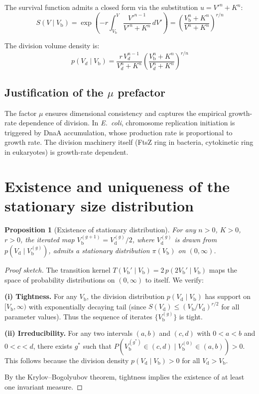 \documentclass[11pt]{article}
\newtheorem{proposition}{Proposition}
\newcommand{\Vb}{V_{\mathrm{b}}}
\newcommand{\Vd}{V_{\mathrm{d}}}
\begin{document}
The survival function admits a closed form via the substitution
$u = V'^n + K^n$:
\begin{equation}
  S(V \mid \Vb) = \exp\!\left(-r \int_{\Vb}^{V}
    \frac{V'^{n-1}}{V'^n + K^n}\, dV'\right)
  = \left(\frac{\Vb^n + K^n}{V^n + K^n}\right)^{r/n}
\end{equation}

The division volume density is:
\begin{equation}
  p(V_d \mid \Vb) = \frac{r\, V_d^{n-1}}{V_d^n + K^n}
    \left(\frac{\Vb^n + K^n}{V_d^n + K^n}\right)^{r/n}
\end{equation}

\subsection{Justification of the $\mu$ prefactor}

The factor $\mu$ ensures dimensional consistency and captures the
empirical growth-rate dependence of division.  In \textit{E.~coli},
chromosome replication initiation is triggered by DnaA accumulation,
whose production rate is proportional to growth
rate\cite{si2019}.  The division machinery itself (FtsZ ring in
bacteria, cytokinetic ring in eukaryotes) is growth-rate dependent.

\section{Existence and uniqueness of the stationary size distribution}

\begin{proposition}[Existence of stationary distribution]
For any $n > 0$, $K > 0$, $r > 0$, the iterated map
$\Vb^{(g+1)} = \Vd^{(g)}/2$, where $\Vd^{(g)}$ is drawn from
$p(\Vd \mid \Vb^{(g)})$, admits a stationary distribution $\pi(\Vb)$
on $(0, \infty)$.
\end{proposition}

\begin{proof}[Proof sketch]
The transition kernel $T(\Vb' \mid \Vb) = 2\, p(2\Vb' \mid \Vb)$
maps the space of probability distributions on $(0,\infty)$ to itself.
We verify:

\textbf{(i) Tightness.}  For any $\Vb$, the division distribution
$p(\Vd \mid \Vb)$ has support on $[\Vb, \infty)$ with exponentially
decaying tail (since $S(\Vd) \leq (\Vb/\Vd)^{r/2}$ for all
parameter values).  Thus the sequence of iterates $\{\Vb^{(g)}\}$ is
tight.

\textbf{(ii) Irreducibility.}  For any two intervals $(a,b)$ and
$(c,d)$ with $0 < a < b$ and $0 < c < d$, there exists $g^*$ such
that $P(\Vb^{(g^*)} \in (c,d) \mid \Vb^{(0)} \in (a,b)) > 0$.  This
follows because the division density $p(\Vd \mid \Vb) > 0$ for all
$\Vd > \Vb$.

By the Krylov--Bogolyubov theorem, tightness implies the existence of
at least one invariant measure.
\end{proof}
\end{document}
